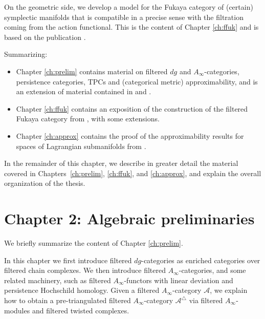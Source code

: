 On the geometric side, we develop a model for the Fukaya category of (certain) symplectic manifolds that is compatible in a precise sense with the filtration coming from the action functional. This is the content of Chapter \ref{ch:ffuk} and is based on the publication \cite{Amb:fil-fuk}.

Summarizing:
\begin{itemize}
    \item Chapter \ref{ch:prelim} contains material on filtered $dg$ and $A_\infty$-categories, persistence categories, TPCs and (categorical metric) approximability, and is an extension of material contained in \cite{Amb:fil-fuk} and \cite{ABC26}.
    \item Chapter \ref{ch:ffuk} contains an exposition of the construction of the filtered Fukaya category from \cite{Amb:fil-fuk}, with some extensions.
    \item Chapter \ref{ch:approx} contains the proof of the approximability results for spaces of Lagrangian submanifolds from \cite{ABC26}.
\end{itemize}
In the remainder of this chapter, we describe in greater detail the material covered in Chapters~\ref{ch:prelim}, \ref{ch:ffuk}, and \ref{ch:approx}, and explain the overall organization of the thesis.

\newpage

\section{Chapter 2: Algebraic preliminaries}\label{intro:chapter1}
We briefly summarize the content of Chapter \ref{ch:prelim}.

In this chapter we first introduce filtered $dg$-categories as enriched categories over filtered chain complexes. We then introduce filtered $A_\infty$-categories, and some related machinery, such as filtered $A_\infty$-functors with linear deviation and persistence Hochschild homology. Given a filtered $A_\infty$-category $\mathcal{A}$, we explain how to obtain a pre-triangulated filtered $A_\infty$-category $\mathcal{A}^\triangle$ via filtered $A_\infty$-modules and filtered twisted complexes.\\

